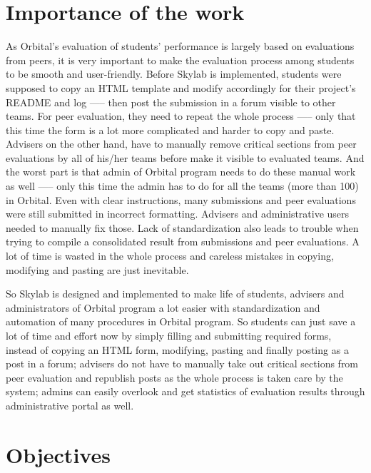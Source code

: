 \section{Importance of the work}

As Orbital's evaluation of students' performance is largely based on evaluations from peers, it is very important to make the evaluation process among students to be smooth and user-friendly. Before Skylab is implemented, students were supposed to copy an HTML template and modify accordingly for their project's README and log —-- then post the submission in a forum visible to other teams. For peer evaluation, they need to repeat the whole process —-- only that this time the form is a lot more complicated and harder to copy and paste. Advisers on the other hand, have to manually remove critical sections from peer evaluations by all of his/her teams before make it visible to evaluated teams. And the worst part is that admin of Orbital program needs to do these manual work as well —-- only this time the admin has to do for all the teams (more than 100) in Orbital. Even with clear instructions, many submissions and peer evaluations were still submitted in incorrect formatting.  Advisers and administrative users needed to manually fix those. Lack of standardization also leads to trouble when trying to compile a consolidated result from submissions and peer evaluations. A lot of time is wasted in the whole process and careless mistakes in copying, modifying and pasting are just inevitable. 

So Skylab is designed and implemented to make life of students, advisers and administrators of Orbital program a lot easier with standardization and automation of many procedures in Orbital program. So students can just save a lot of time and effort now by simply filling and submitting required forms, instead of copying an HTML form, modifying, pasting and finally posting as a post in a forum; advisers do not have to manually take out critical sections from peer evaluation and republish posts as the whole process is taken care by the system; admins can easily overlook and get statistics of evaluation results through administrative portal as well.

\section{Objectives}

